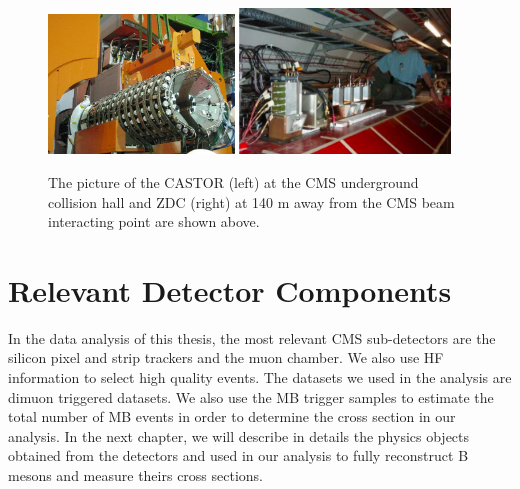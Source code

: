 \begin{figure}[hbtp]
\begin{center}
\includegraphics[width=0.44\textwidth]{Figures/Chapter2/CASTOR.png}
\includegraphics[width=0.50\textwidth]{Figures/Chapter2/CMSZDC.png}
\caption{The picture of the CASTOR (left) at the CMS underground collision hall and ZDC (right) at 140 m away from the CMS beam interacting point are shown above.}
\label{CASTORZDC}
\end{center}
\end{figure} 


\section{Relevant Detector Components}

In the data analysis of this thesis, the most relevant CMS sub-detectors are the silicon pixel and strip trackers and the muon chamber. We also use HF information to select high quality events. The datasets we used in the analysis are dimuon triggered datasets. We also use the MB trigger samples to estimate the total number of MB events in order to determine the cross section in our analysis. In the next chapter, we will describe in details the physics objects obtained from the detectors and used in our analysis to fully reconstruct B mesons and measure theirs cross sections.






